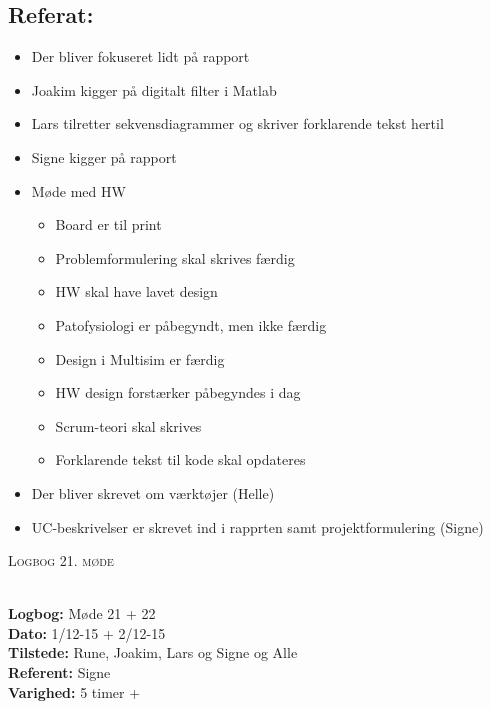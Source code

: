 \documentclass[a4paper,11pt,oneside]{memoir}
\begin{document}
\subsection{Referat:}
\begin{itemize}
\item Der bliver fokuseret lidt på rapport
\item Joakim kigger på digitalt filter i Matlab
\item Lars tilretter sekvensdiagrammer og skriver forklarende tekst hertil
\item Signe kigger på rapport 
\item Møde med HW
\begin{itemize}
\item Board er til print
\item Problemformulering skal skrives færdig
\item HW skal have lavet design 
\item Patofysiologi er påbegyndt, men ikke færdig
\item Design i Multisim er færdig
\item HW design forstærker påbegyndes i dag 
\item Scrum-teori skal skrives 
\item Forklarende tekst til kode skal opdateres  
\end{itemize}
\item Der bliver skrevet om værktøjer (Helle)
\item UC-beskrivelser er skrevet ind i rapprten samt projektformulering (Signe)
\end{itemize}


\newpage


\begin{center} 
\huge{\textsc{Logbog 21. møde}}
\end{center}

\textbf{ }
\\
\textbf{Logbog:} Møde 21 + 22
\\
\textbf{Dato:} 1/12-15 + 2/12-15
\\
\textbf{Tilstede:} Rune, Joakim, Lars og Signe og Alle
\\
\textbf{Referent:} Signe
\\
\textbf{Varighed:} 5 timer + 
\\
\end{document}
